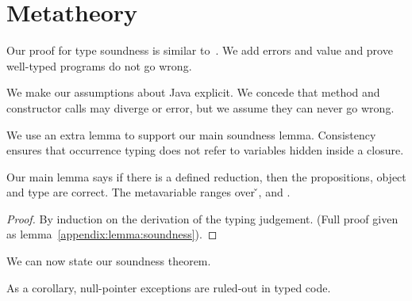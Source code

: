 \section{Metatheory}
\label{sec:metatheory}

Our proof for type soundness is similar to~\citet{TF10}. We add
errors and \wrong{} value and prove
well-typed programs do not go wrong.

We make our assumptions about Java explicit. We concede that
method and constructor calls may diverge or error, but we assume they can
never go wrong.

{}



We use an extra lemma to support our main soundness lemma. Consistency
ensures that occurrence typing does not refer to variables
hidden inside a closure.

{}

Our main lemma says if there is a defined reduction, then the propositions, object
and type are correct.
The metavariable  ranges over \v{}, \errorvalv{} and \wrong{}.

\begin{lemma}\label{main:lemma:soundness}

  {\soundnesslemmahypothesis}
  \begin{proof}
    By induction on the derivation of the typing judgement. 
    (Full proof given as lemma~\ref{appendix:lemma:soundness}).
  \end{proof}
\end{lemma}


We can now state our soundness theorem.

{}

{}
\noindent
As a corollary, null-pointer exceptions are ruled-out in typed code.
%
